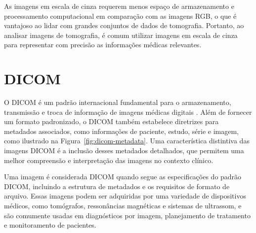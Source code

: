 As imagens em escala de cinza requerem menos espaço de armazenamento e processamento computacional em comparação com as imagens RGB, o que é vantajoso ao lidar com grandes conjuntos de dados de tomografia. Portanto, ao analisar imagens de tomografia, é comum utilizar imagens em escala de cinza para representar com precisão as informações médicas relevantes.

\begin{figure}[H]
	\centering
\end{figure}


\section{\acrfull{DICOM}}
O \acrshort{DICOM} é um padrão internacional fundamental para o armazenamento, transmissão e troca de informação de imagens médicas digitais \cite{DICOM}. Além de fornecer um formato padronizado, o \acrshort{DICOM} também estabelece diretrizes para metadados associados, como informações de paciente, estudo, série e imagem, como ilustrado na Figura~\ref{fig:dicom-metadata}. Uma característica distintiva das imagens \acrshort{DICOM} é a inclusão desses metadados detalhados, que permitem uma melhor compreensão e interpretação das imagens no contexto clínico.

Uma imagem é considerada \acrshort{DICOM} quando segue as especificações do padrão \acrshort{DICOM}, incluindo a estrutura de metadados e os requisitos de formato de arquivo. Essas imagens podem ser adquiridas por uma variedade de dispositivos médicos, como tomógrafos, ressonâncias magnéticas e sistemas de ultrassom, e são comumente usadas em diagnósticos por imagem, planejamento de tratamento e monitoramento de pacientes.

